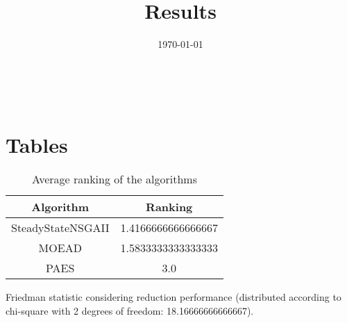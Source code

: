 \documentclass{article}
\title{Results}
\author{}
\date{\today}
\begin{document}
\oddsidemargin 0in \topmargin 0in\maketitle
\
\section{Tables}
\begin{table}[!htp]
\centering
\caption{Average ranking of the algorithms}
\begin{tabular}{c|c}
Algorithm&Ranking\\
\hline
SteadyStateNSGAII&1.4166666666666667\\
MOEAD&1.5833333333333333\\
PAES&3.0\\
\end{tabular}
\end{table}


Friedman statistic considering reduction performance (distributed according to chi-square with 2 degrees of freedom: 18.16666666666667).
\end{document}
